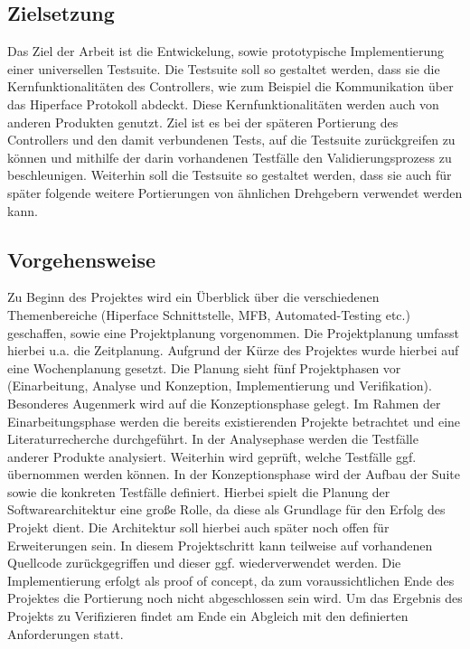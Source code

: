 	\subsection{Zielsetzung}
	Das Ziel der Arbeit ist die Entwickelung, sowie prototypische Implementierung einer universellen Testsuite. Die Testsuite soll so gestaltet werden, dass sie die Kernfunktionalitäten des Controllers, wie zum Beispiel die Kommunikation über das Hiperface Protokoll abdeckt. Diese Kernfunktionalitäten werden auch von anderen Produkten genutzt. Ziel ist es bei der späteren Portierung des Controllers und den damit verbundenen Tests, auf die Testsuite zurückgreifen zu können und mithilfe der darin vorhandenen Testfälle den Validierungsprozess zu beschleunigen. Weiterhin soll die Testsuite so gestaltet werden, dass sie auch für später folgende weitere Portierungen von ähnlichen Drehgebern verwendet werden kann.
	\subsection{Vorgehensweise}
	Zu Beginn des Projektes wird ein Überblick über die verschiedenen Themenbereiche (Hiperface Schnittstelle, \ac{MFB}, Automated-Testing etc.) geschaffen, sowie eine Projektplanung vorgenommen. Die Projektplanung umfasst hierbei u.a. die Zeitplanung. Aufgrund der Kürze des Projektes wurde hierbei auf eine Wochenplanung gesetzt. Die Planung sieht fünf Projektphasen vor (Einarbeitung, Analyse und Konzeption, Implementierung und Verifikation). Besonderes Augenmerk wird auf die Konzeptionsphase gelegt. Im Rahmen der Einarbeitungsphase werden die bereits existierenden Projekte betrachtet und eine Literaturrecherche durchgeführt. In der Analysephase werden die Testfälle anderer Produkte analysiert. Weiterhin wird geprüft, welche Testfälle ggf. übernommen werden können. In der Konzeptionsphase wird der Aufbau der Suite sowie die konkreten Testfälle definiert. Hierbei spielt die Planung der Softwarearchitektur eine große Rolle, da diese als Grundlage für den Erfolg des Projekt dient. Die Architektur soll hierbei auch später noch offen für Erweiterungen sein. In diesem Projektschritt kann teilweise auf vorhandenen Quellcode zurückgegriffen und dieser ggf. wiederverwendet werden. Die Implementierung erfolgt als proof of concept, da zum voraussichtlichen Ende des Projektes die Portierung noch nicht abgeschlossen sein wird. Um das Ergebnis des Projekts zu Verifizieren findet am Ende ein Abgleich mit den definierten Anforderungen statt. 
